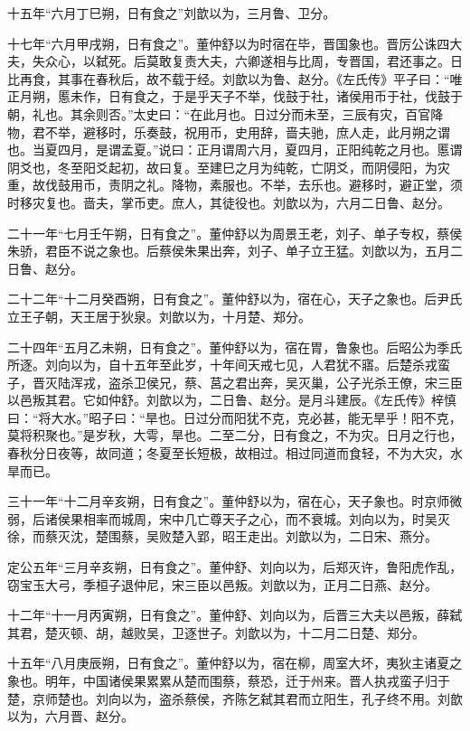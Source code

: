 \documentclass[]{article}
\begin{document}
十五年``六月丁巳朔，日有食之''刘歆以为，三月鲁、卫分。

十七年``六月甲戌朔，日有食之''。董仲舒以为时宿在毕，晋国象也。晋厉公诛四大夫，失众心，以弑死。后莫敢复责大夫，六卿遂相与比周，专晋国，君还事之。日比再食，其事在春秋后，故不载于经。刘歆以为鲁、赵分。《左氏传》平子曰：``唯正月朔，慝未作，日有食之，于是乎天子不举，伐鼓于社，诸侯用币于社，伐鼓于朝，礼也。其余则否。''太史曰：``在此月也。日过分而未至，三辰有灾，百官降物，君不举，避移时，乐奏鼓，祝用币，史用辞，啬夫驰，庶人走，此月朔之谓也。当夏四月，是谓孟夏。''说曰：正月谓周六月，夏四月，正阳纯乾之月也。慝谓阴爻也，冬至阳爻起初，故曰复。至建巳之月为纯乾，亡阴爻，而阴侵阳，为灾重，故伐鼓用币，责阴之礼。降物，素服也。不举，去乐也。避移时，避正堂，须时移灾复也。啬夫，掌币吏。庶人，其徒役也。刘歆以为，六月二日鲁、赵分。

二十一年``七月壬午朔，日有食之''。董仲舒以为周景王老，刘子、单子专权，蔡侯朱骄，君臣不说之象也。后蔡侯朱果出奔，刘子、单子立王猛。刘歆以为，五月二日鲁、赵分。

二十二年``十二月癸酉朔，日有食之''。董仲舒以为，宿在心，天子之象也。后尹氏立王子朝，天王居于狄泉。刘歆以为，十月楚、郑分。

二十四年``五月乙未朔，日有食之''。董仲舒以为，宿在胃，鲁象也。后昭公为季氏所逐。刘向以为，自十五年至此岁，十年间天戒七见，人君犹不寤。后楚杀戎蛮子，晋灭陆浑戎，盗杀卫侯兄，蔡、莒之君出奔，吴灭巢，公子光杀王僚，宋三臣以邑叛其君。它如仲舒。刘歆以为，二日鲁、赵分。是月斗建辰。《左氏传》梓慎曰：``将大水。''昭子曰：``旱也。日过分而阳犹不克，克必甚，能无旱乎！阳不克，莫将积聚也。''是岁秋，大雩，旱也。二至二分，日有食之，不为灾。日月之行也，春秋分日夜等，故同道；冬夏至长短极，故相过。相过同道而食轻，不为大灾，水旱而已。

三十一年``十二月辛亥朔，日有食之''。董仲舒以为，宿在心，天子象也。时京师微弱，后诸侯果相率而城周，宋中几亡尊天子之心，而不衰城。刘向以为，时吴灭徐，而蔡灭沈，楚围蔡，吴败楚入郢，昭王走出。刘歆以为，二日宋、燕分。

定公五年``三月辛亥朔，日有食之''。董仲舒、刘向以为，后郑灭许，鲁阳虎作乱，窃宝玉大弓，季桓子退仲尼，宋三臣以邑叛。刘歆以为，正月二日燕、赵分。

十二年``十一月丙寅朔，日有食之''。董仲舒、刘向以为，后晋三大夫以邑叛，薛弑其君，楚灭顿、胡，越败吴，卫逐世子。刘歆以为，十二月二日楚、郑分。

十五年``八月庚辰朔，日有食之''。董仲舒以为，宿在柳，周室大坏，夷狄主诸夏之象也。明年，中国诸侯果累累从楚而围蔡，蔡恐，迁于州来。晋人执戎蛮子归于楚，京师楚也。刘向以为，盗杀蔡侯，齐陈乞弑其君而立阳生，孔子终不用。刘歆以为，六月晋、赵分。
\end{document}
